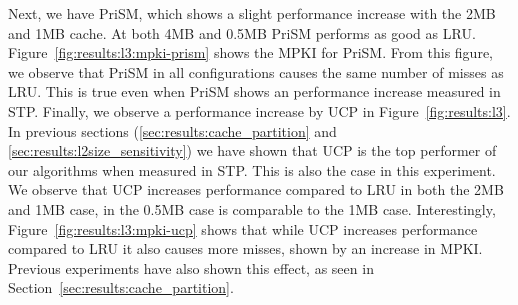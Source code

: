 Next, we have PriSM, which shows a slight performance increase with the 2MB and 1MB cache. 
At both 4MB and 0.5MB PriSM performs as good as LRU.
Figure~\ref{fig:results:l3:mpki-prism} shows the MPKI for PriSM.
From this figure, we observe that PriSM in all configurations causes the same number of misses as LRU.
This is true even when PriSM shows an performance increase measured in STP.
Finally, we observe a performance increase by UCP in Figure~\ref{fig:results:l3}. 
In previous sections (\ref{sec:results:cache_partition} and \ref{sec:results:l2size_sensitivity}) we have shown that UCP is the top performer of our algorithms when measured in STP.
This is also the case in this experiment.
We observe that UCP increases performance compared to LRU in both the 2MB and 1MB case, in the 0.5MB case is comparable to the 1MB case.
Interestingly, Figure~\ref{fig:results:l3:mpki-ucp} shows that while UCP increases performance compared to LRU it also causes more misses, shown by an increase in MPKI.
Previous experiments have also shown this effect, as seen in Section~\ref{sec:results:cache_partition}.
